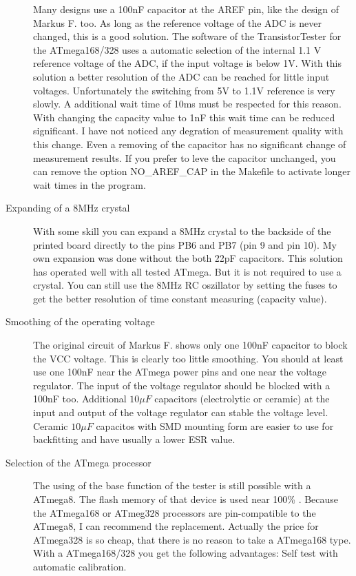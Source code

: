 \begin{description}
Many designs use a 100nF capacitor at the AREF pin, like the design of Markus F. too.
As long as the reference voltage of the ADC is never changed, this is a good solution.
The software of the TransistorTester for the ATmega168/328 uses a automatic selection
of the internal 1.1 V reference voltage of the ADC, if the input voltage is below 1V.
With this solution a better resolution of the ADC can be reached for little input voltages.
Unfortunately the switching from 5V to 1.1V reference is very slowly. A additional
wait time of 10ms must be respected for this reason.
With changing the capacity value to 1nF this wait time can be reduced significant.
I have not noticed any degration of measurement quality with this change.
Even a removing of the capacitor has no significant change of measurement results.
If you prefer to leve the capacitor unchanged, you can remove the option NO\_AREF\_CAP
in the Makefile to activate longer wait times in the program.
\item[Expanding of a 8MHz crystal]
With some skill you can expand a 8MHz crystal to the backside of the printed board
directly to the pins PB6 and PB7 (pin 9 and pin 10).
My own expansion was done without the both 22pF capacitors.
This solution has operated well with all tested ATmega.
But it is not required to use a crystal. You can still use the 8MHz RC oszillator
by setting the fuses to get the better resolution of time constant measuring (capacity value).
\item[Smoothing of the operating voltage]
The original circuit of Markus F. shows only one 100nF capacitor to block the VCC voltage.
This is clearly too little smoothing. You should at least use one 100nF near the ATmega power pins
and one near the voltage regulator. The input of the voltage regulator should be
blocked with a 100nF too.
Additional \(10\mu F\) capacitors (electrolytic or ceramic) at the input and
output of the voltage regulator can stable the voltage level.
Ceramic \(10\mu F\) capacitos with SMD mounting form are easier to use for backfitting
and have usually a lower ESR value. 
\item[Selection of the ATmega processor]
The using of the base function of the tester is still possible with a ATmega8.
The flash memory of that device is used near 100\% .
Because the ATmega168 or ATmeg328 processors are pin-compatible to the ATmega8,
I can recommend the replacement.
Actually the price for ATmega328 is so cheap, that there is no reason to take
a ATmega168 type.
With a ATmega168/328 you get the following advantages:
Self test with automatic calibration.\\

\end{description}
